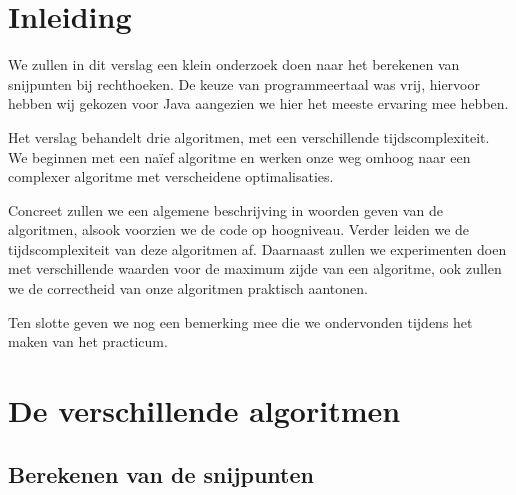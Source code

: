 \documentclass{article}
\begin{document}
\tableofcontents
\newpage
\section{Inleiding}
We zullen in dit verslag een klein onderzoek doen naar het berekenen van snijpunten bij rechthoeken. De keuze van programmeertaal was vrij, hiervoor hebben wij gekozen voor Java aangezien we hier het meeste ervaring mee hebben.

Het verslag behandelt drie algoritmen, met een verschillende tijdscomplexiteit. We beginnen met een na\"ief algoritme en werken onze weg omhoog naar een complexer algoritme met verscheidene optimalisaties.

Concreet zullen we een algemene beschrijving in woorden geven van de algoritmen, alsook voorzien we de code op hoogniveau. Verder leiden we de tijdscomplexiteit van deze algoritmen af. Daarnaast zullen we experimenten doen met verschillende waarden voor de maximum zijde van een algoritme, ook zullen we de correctheid van onze algoritmen praktisch aantonen. 

Ten slotte geven we nog een bemerking mee die we ondervonden tijdens het maken van het practicum.



\newpage
\section{De verschillende algoritmen}





\subsection{Berekenen van de snijpunten}
\end{document}
